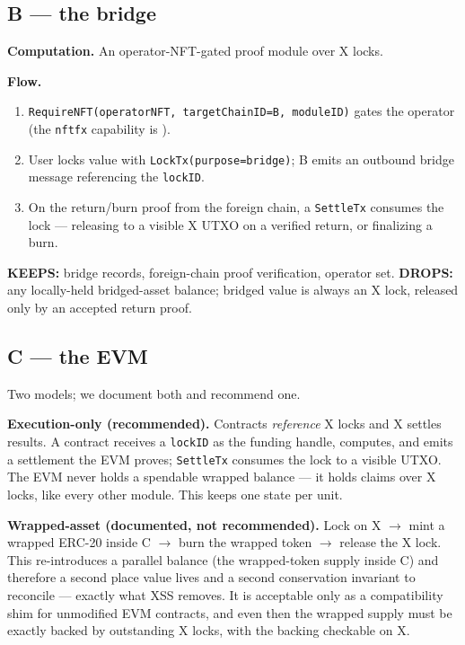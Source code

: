\subsection{B --- the bridge}

\textbf{Computation.} An operator-NFT-gated proof module over X locks.

\textbf{Flow.}
\begin{enumerate}[leftmargin=2em,nosep]
\item \texttt{RequireNFT(operatorNFT, targetChainID=B, moduleID)} gates
  the operator (the \texttt{nftfx} capability is \IMPL{}).
\item User locks value with \texttt{LockTx(purpose=bridge)}; B emits an
  outbound bridge message referencing the \texttt{lockID}.
\item On the return/burn proof from the foreign chain, a
  \texttt{SettleTx} consumes the lock --- releasing to a visible X UTXO
  on a verified return, or finalizing a burn.
\end{enumerate}

\textbf{KEEPS:} bridge records, foreign-chain proof verification,
operator set. \textbf{DROPS:} any locally-held bridged-asset balance;
bridged value is always an X lock, released only by an accepted return
proof.

\subsection{C --- the EVM}

Two models; we document both and recommend one.

\textbf{Execution-only (recommended).} Contracts \emph{reference} X
locks and X settles results. A contract receives a \texttt{lockID} as
the funding handle, computes, and emits a settlement the EVM proves;
\texttt{SettleTx} consumes the lock to a visible UTXO. The EVM never
holds a spendable wrapped balance --- it holds claims over X locks, like
every other module. This keeps one state per unit.

\textbf{Wrapped-asset (documented, not recommended).} Lock on X
$\to$ mint a wrapped ERC-20 inside C $\to$ burn the wrapped token
$\to$ release the X lock. This re-introduces a parallel balance (the
wrapped-token supply inside C) and therefore a second place value lives
and a second conservation invariant to reconcile --- exactly what XSS
removes. It is acceptable only as a compatibility shim for unmodified
EVM contracts, and even then the wrapped supply must be exactly backed
by outstanding X locks, with the backing checkable on X.

